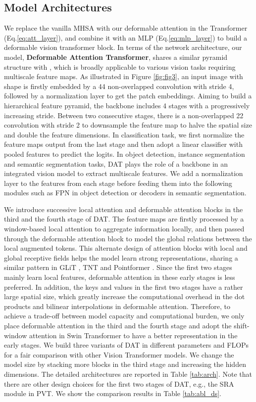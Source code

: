 \subsection{Model Architectures}
We replace the vanilla MHSA with our deformable attention in the Transformer (Eq.\eqref{eq:att_layer}), and combine it with an MLP (Eq.\eqref{eq:mlp_layer}) to build a deformable vision transformer block. In terms of the network architecture, our model, \textbf{Deformable Attention Transformer}, shares a similar pyramid structure with \cite{PVT,Swin,dpt,botnet}, which is 
broadly applicable to various vision tasks requiring multiscale feature maps. As illustrated in Figure \ref{fig:fig3}, an input image with shape  is firstly embedded by a 44 non-overlapped convolution with stride 4, followed by a normalization layer to get the  patch embeddings. Aiming to build a hierarchical feature pyramid, the backbone includes 4 stages with a progressively increasing stride. Between two consecutive stages, there is a non-overlapped 22 convolution with stride 2 to downsample the feature map to halve the spatial size and double the feature dimensions. In classification task, we first normalize the feature maps output from the last stage and then adopt a linear classifier with pooled features to predict the logits. In object detection, instance segmentation and semantic segmentation tasks, DAT plays the role of a backbone in an integrated vision model to extract multiscale features. We add a normalization layer to the features from each stage before feeding them into the following modules such as FPN \cite{fpn} in object detection or decoders in semantic segmentation. 


We introduce successive local attention and deformable attention blocks in the third and the fourth stage of DAT. The feature maps are firstly processed by a window-based local attention to aggregate information locally, and then passed through the deformable attention block to model the global relations between the local augmented tokens. This alternate design of attention blocks with local and global receptive fields helps the model learn strong representations, sharing a similar pattern in GLiT \cite{glit}, TNT \cite{tnt} and Pointformer \cite{pointformer}. 
Since the first two stages mainly learn local features, deformable attention in these early stages is less preferred.
In addition, the keys and values in the first two stages have a rather large spatial size, which greatly increase the computational overhead in the dot products and bilinear interpolations in deformable attention. Therefore, to achieve a trade-off between model capacity and computational burden, we only place deformable attention in the third and the fourth stage and adopt the shift-window attention in Swin Transformer \cite{Swin} to have a better representation in the early stages. We build three variants of DAT in different parameters and FLOPs for a fair comparison with other Vision Transformer models. We change the model size by stacking more blocks in the third stage and increasing the hidden dimensions. The detailed architectures are reported in Table \ref{tab:arch}.
Note that there are other design choices for the first two stages of DAT, 
e.g., the SRA module in PVT. We show the comparison results in Table \ref{tab:abl_ds}.

